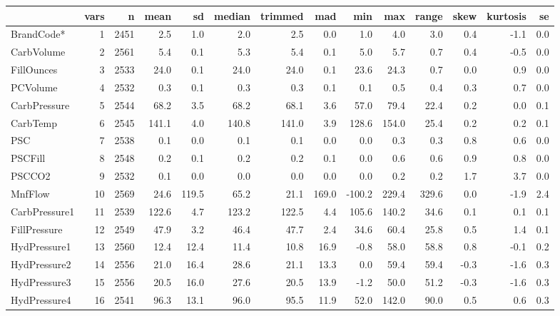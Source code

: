 \documentclass[]{report}
\begin{document}
\begin{table}[H]
\centering\begingroup\fontsize{8}{10}\selectfont

\begin{tabular}{lrrrrrrrrrrrrr}
\toprule
  & vars & n & mean & sd & median & trimmed & mad & min & max & range & skew & kurtosis & se\\
\midrule
\rowcolor{gray!6}  BrandCode* & 1 & 2451 & 2.5 & 1.0 & 2.0 & 2.5 & 0.0 & 1.0 & 4.0 & 3.0 & 0.4 & -1.1 & 0.0\\
CarbVolume & 2 & 2561 & 5.4 & 0.1 & 5.3 & 5.4 & 0.1 & 5.0 & 5.7 & 0.7 & 0.4 & -0.5 & 0.0\\
\rowcolor{gray!6}  FillOunces & 3 & 2533 & 24.0 & 0.1 & 24.0 & 24.0 & 0.1 & 23.6 & 24.3 & 0.7 & 0.0 & 0.9 & 0.0\\
PCVolume & 4 & 2532 & 0.3 & 0.1 & 0.3 & 0.3 & 0.1 & 0.1 & 0.5 & 0.4 & 0.3 & 0.7 & 0.0\\
\rowcolor{gray!6}  CarbPressure & 5 & 2544 & 68.2 & 3.5 & 68.2 & 68.1 & 3.6 & 57.0 & 79.4 & 22.4 & 0.2 & 0.0 & 0.1\\
\addlinespace
CarbTemp & 6 & 2545 & 141.1 & 4.0 & 140.8 & 141.0 & 3.9 & 128.6 & 154.0 & 25.4 & 0.2 & 0.2 & 0.1\\
\rowcolor{gray!6}  PSC & 7 & 2538 & 0.1 & 0.0 & 0.1 & 0.1 & 0.0 & 0.0 & 0.3 & 0.3 & 0.8 & 0.6 & 0.0\\
PSCFill & 8 & 2548 & 0.2 & 0.1 & 0.2 & 0.2 & 0.1 & 0.0 & 0.6 & 0.6 & 0.9 & 0.8 & 0.0\\
\rowcolor{gray!6}  PSCCO2 & 9 & 2532 & 0.1 & 0.0 & 0.0 & 0.0 & 0.0 & 0.0 & 0.2 & 0.2 & 1.7 & 3.7 & 0.0\\
MnfFlow & 10 & 2569 & 24.6 & 119.5 & 65.2 & 21.1 & 169.0 & -100.2 & 229.4 & 329.6 & 0.0 & -1.9 & 2.4\\
\addlinespace
\rowcolor{gray!6}  CarbPressure1 & 11 & 2539 & 122.6 & 4.7 & 123.2 & 122.5 & 4.4 & 105.6 & 140.2 & 34.6 & 0.1 & 0.1 & 0.1\\
FillPressure & 12 & 2549 & 47.9 & 3.2 & 46.4 & 47.7 & 2.4 & 34.6 & 60.4 & 25.8 & 0.5 & 1.4 & 0.1\\
\rowcolor{gray!6}  HydPressure1 & 13 & 2560 & 12.4 & 12.4 & 11.4 & 10.8 & 16.9 & -0.8 & 58.0 & 58.8 & 0.8 & -0.1 & 0.2\\
HydPressure2 & 14 & 2556 & 21.0 & 16.4 & 28.6 & 21.1 & 13.3 & 0.0 & 59.4 & 59.4 & -0.3 & -1.6 & 0.3\\
\rowcolor{gray!6}  HydPressure3 & 15 & 2556 & 20.5 & 16.0 & 27.6 & 20.5 & 13.9 & -1.2 & 50.0 & 51.2 & -0.3 & -1.6 & 0.3\\
\addlinespace
HydPressure4 & 16 & 2541 & 96.3 & 13.1 & 96.0 & 95.5 & 11.9 & 52.0 & 142.0 & 90.0 & 0.5 & 0.6 & 0.3\\

\end{tabular}
\end{table}
\end{document}
